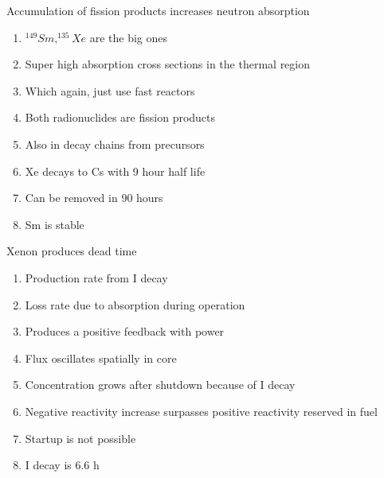 \documentclass[aspectratio=1610,pdftex,dvipsnames,compress,xcolor={dvipsnames}]{beamer}
\begin{document}
\begin{frame}{Accumulation of fission products increases neutron absorption}
    \begin{enumerate}[series=outerlist,topsep=0pt,itemsep=15pt,leftmargin=*,label=(\arabic*)]
        \item[]$^{149}Sm, ^{135}Xe$ are the big ones
        \item[]Super high absorption cross sections in the thermal region
        \item[]Which again, just use fast reactors
        \item[]Both radionuclides are fission products
        \item[]Also in decay chains from precursors
        \item[]Xe decays to Cs with 9 hour half life
        \item[]Can be removed in 90 hours
        \item[]Sm is stable
    \end{enumerate}
\end{frame}


\begin{frame}{Xenon produces dead time}
    \begin{enumerate}[series=outerlist,topsep=0pt,itemsep=15pt,leftmargin=*,label=(\arabic*)]
        \item[]Production rate from I decay
        \item[]Loss rate due to absorption during operation
        \item[]Produces a positive feedback with power
        \item[]Flux oscillates spatially in core
        \item[]Concentration grows after shutdown because of I decay
        \item[]Negative reactivity increase surpasses positive reactivity reserved in fuel
        \item[]Startup is not possible
        \item[]I decay is 6.6 h
    \end{enumerate}
\end{frame}
\end{document}
